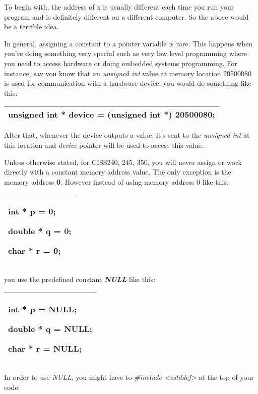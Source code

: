 \documentclass[
]{article}
\begin{document}
To begin with, the address of x is usually different each time you run
your program and is definitely different on a different computer. So the
above would be a terrible idea.

In general, assigning a constant to a pointer variable is rare. This
happens when you're doing something very special such as very low level
programming where you need to access hardware or doing embedded systems
programming. For instance, say you know that an \emph{unsigned int}
value at memory location 20500080 is used for communication with a
hardware device, you would do something like this:

\begin{longtable}[]{@{}l@{}}
\toprule
\endhead
unsigned int * device = (unsigned int *) 20500080;\tabularnewline
\bottomrule
\end{longtable}

After that, whenever the device outputs a value, it's sent to the
\emph{unsigned int} at this location and \emph{device} pointer will be
used to access this value.

Unless otherwise stated, for CISS240, 245, 350, you will never assign or
work directly with a constant memory address value. The only exception
is the memory address \textbf{0}. However instead of using memory
address 0 like this:

\begin{longtable}[]{@{}l@{}}
\toprule
\endhead
\begin{minipage}[t]{0.97\columnwidth}\raggedright
int * p = 0;

double * q = 0;

char * r = 0;\strut
\end{minipage}\tabularnewline
\bottomrule
\end{longtable}

you use the predefined constant \emph{\textbf{NULL}} like this:

\begin{longtable}[]{@{}l@{}}
\toprule
\endhead
\begin{minipage}[t]{0.97\columnwidth}\raggedright
int * p = NULL;

double * q = NULL;

char * r = NULL;\strut
\end{minipage}\tabularnewline
\bottomrule
\end{longtable}

In order to use \emph{NULL}, you might have to \emph{\#include
\textless cstddef\textgreater{}} at the top of your code:
\end{document}
